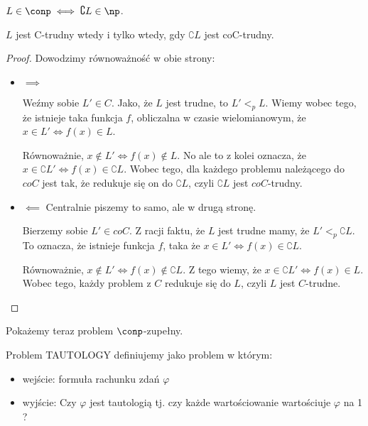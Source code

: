 \begin{definition}
     \(  L \in  \conp \iff \complement{L} \in \np \).
\end{definition}

\begin{lemma}
    \( L \) jest C-trudny wtedy i tylko wtedy, gdy \( \complement{L} \) jest  coC-trudny. 
\end{lemma}

\begin{proof}

Dowodzimy równoważność w obie strony:

\begin{itemize}
    \item     \( \implies \)
    
    Weźmy sobie \( L' \in C\). Jako, że \(L\) jest trudne, to \(L' <_{p} L\).  Wiemy wobec tego, że istnieje taka funkcja \(f\), obliczalna w czasie wielomianowym, że \( x \in L' \iff f(x) \in L\).
    
    Równoważnie, \( x \not\in L' \iff f(x) \not \in L\). No ale to z kolei oznacza, że \( x \in \complement{L'} \iff f(x) \in \complement{L}\). Wobec tego, dla każdego problemu należącego do \(coC\) jest tak, że redukuje się on do \( \complement{L} \), czyli \(\complement{L}\) jest \(coC\)-trudny.

    \item \( \impliedby \) 
    Centralnie piszemy to samo, ale w drugą stronę.
    
    
    Bierzemy sobie \( L' \in coC\). Z racji faktu, że \(L\) jest trudne mamy, że \(L' <_{p} \complement{L}\). To oznacza, że istnieje funkcja \(f\), taka że \( x \in L' \iff f(x) \in \complement{L} \). 
    
    Równoważnie, \( x \not \in L' \iff f(x) \not \in \complement{L} \). Z tego wiemy, że \( x \in \complement{L'} \iff f(x) \in L \). Wobec tego, każdy problem z \(C\) redukuje się do \(L\), czyli \(L\) jest \(C\)-trudne. 
    

\end{itemize}

\end{proof}


Pokażemy teraz problem \(\conp\)-zupełny. 

\begin{definition}
    Problem \textsc{TAUTOLOGY} definiujemy jako problem w którym:
    \begin{itemize}
        \item wejście: formuła rachunku zdań \( \varphi \)
        \item wyjście: Czy \( \varphi \) jest tautologią tj. czy każde wartościowanie wartościuje \( \varphi \) na 1 ?
    \end{itemize}
\end{definition}

